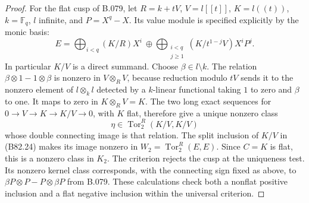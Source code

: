 \begin{proof}
For the flat cusp of B.079, let $R=k+tV$, $V=l[[t]]$, $K=l((t))$,
$k=\mathbb F_q$, $l$ infinite, and $P=X^q-X$. Its value module
is specified explicitly by the monic basis:
\[
 E=\bigoplus_{i<q}(K/R)X^i\ \oplus\!
   \bigoplus_{\substack{i<q\\j\ge1}}
        (K/t^{1-j}V)X^iP^j.                              \tag{B82.24}
\]
In particular $K/V$ is a direct summand. Choose
$\beta\in l\setminus k$. The relation
$\beta\otimes1-1\otimes\beta$ is nonzero in
$V\otimes_RV$, because reduction modulo $tV$ sends it to
the nonzero element of $l\otimes_k l$ detected by a
$k$-linear functional taking $1$ to zero and $\beta$ to one.
It maps to zero in $K\otimes_RV=K$. The two long exact
sequences for $0\to V\to K\to K/V\to0$, with $K$ flat,
therefore give a unique nonzero class
\[
       \eta\in\operatorname{Tor}_2^R(K/V,K/V)
\]
whose double connecting image is that relation. The split
inclusion of $K/V$ in (B82.24) makes its image nonzero in
$W_2=\operatorname{Tor}_2^R(E,E)$. Since $C=K$ is flat,
this is a nonzero class in $K_2$. The criterion rejects the
cusp at the uniqueness test. Its nonzero kernel class corresponds,
with the connecting sign fixed as above, to
$\beta P\otimes P-P\otimes\beta P$ from B.079.
These calculations check both a nonflat positive inclusion and
a flat negative inclusion within the universal criterion.
\end{proof}
